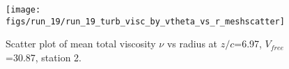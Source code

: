 \begin{figure}[H]
\centering
\texttt{[image: figs/run\_19/run\_19\_turb\_visc\_by\_vtheta\_vs\_r\_meshscatter]}
\caption{Scatter plot of mean total viscosity $\nu$ vs radius at $z/c$=6.97, $V_{free}$=30.87, station 2.}
\label{fig:run_19_turb_visc_by_vtheta_vs_r_meshscatter}
\end{figure}


